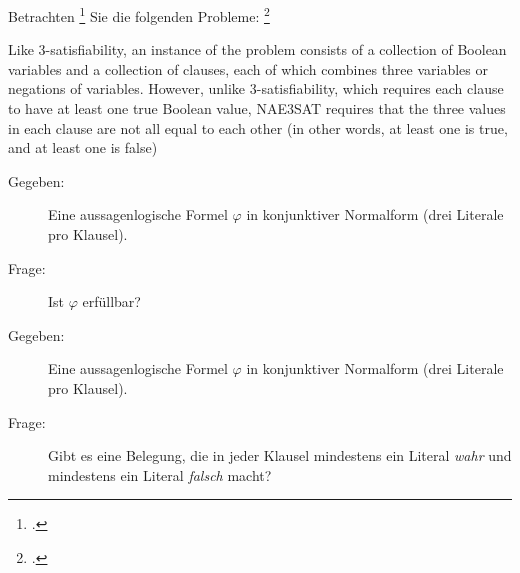 \documentclass{bschlangaul-aufgabe}
\begin{document}


Betrachten \footcite{examen:66115:2017:09}
Sie die folgenden Probleme:
\footcite[StEx F2016 T2 A3, StEx H2017 T1 A3 (Check-Up), Aufgabe 15]{theo:ab:4}

\begin{bExkurs}[SAT]
\bProblemSat
\end{bExkurs}


\begin{bExkurs}
Like 3-satisfiability, an instance of the problem consists of a
collection of Boolean variables and a collection of clauses, each of
which combines three variables or negations of variables. However,
unlike 3-satisfiability, which requires each clause to have at least one
true Boolean value, NAE3SAT requires that the three values in each
clause are not all equal to each other (in other words, at least one is
true, and at least one is false)
\end{bExkurs}

%


\begin{description}
\item[Gegeben:]

Eine aussagenlogische Formel $\varphi$ in konjunktiver Normalform (drei
Literale pro Klausel).

\item[Frage:]

Ist $\varphi$ erfüllbar?
\end{description}

%


\begin{description}
\item[Gegeben:]

Eine aussagenlogische Formel $\varphi$ in konjunktiver Normalform
(drei Literale pro Klausel).

\item[Frage:]

Gibt es eine Belegung, die in jeder Klausel mindestens ein Literal
\emph{wahr} und mindestens ein Literal \emph{falsch} macht?

\end{description}
\end{document}
